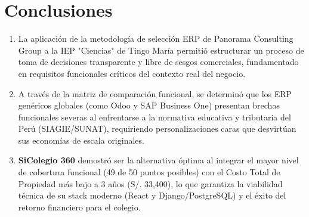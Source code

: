 \documentclass[12pt,a4paper,oneside]{report}
\begin{document}
\chapter*{Conclusiones}

\begin{enumerate}
    \item La aplicación de la metodología de selección ERP de Panorama Consulting Group a la IEP "Ciencias" de Tingo María permitió estructurar un proceso de toma de decisiones transparente y libre de sesgos comerciales, fundamentado en requisitos funcionales críticos del contexto real del negocio.
    \item A través de la matriz de comparación funcional, se determinó que los ERP genéricos globales (como Odoo y SAP Business One) presentan brechas funcionales severas al enfrentarse a la normativa educativa y tributaria del Perú (SIAGIE/SUNAT), requiriendo personalizaciones caras que desvirtúan sus economías de escala originales.
    \item \textbf{SiColegio 360} demostró ser la alternativa óptima al integrar el mayor nivel de cobertura funcional (49 de 50 puntos posibles) con el Costo Total de Propiedad más bajo a 3 años (S/. 33,400), lo que garantiza la viabilidad técnica de su stack moderno (React y Django/PostgreSQL) y el éxito del retorno financiero para el colegio.
\end{enumerate}
\end{document}
